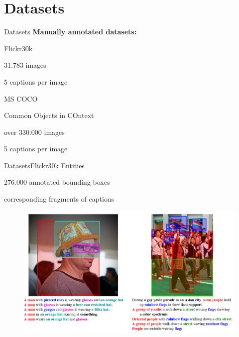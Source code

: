 \documentclass[16pt]{beamer}
\newenvironment{wideitemize}{\itemize\addtolength{\itemsep}{10pt}}{\enditemize}
\begin{document}
\section{Datasets}%
\begin{frame}{Datasets}
\textbf{Manually annotated datasets:}
\begin{wideitemize}
\item Flickr30k \cite{Young2014}
\begin{wideitemize}
    \item 31.783 images
    \item 5 captions per image
\end{wideitemize}
\item MS COCO \cite{Lin2014}
\begin{wideitemize}
\item Common Objects in COntext
\item over 330.000 images
\item 5 captions per image
\end{wideitemize}
\end {wideitemize}

\end{frame}

\begin{frame}{Datasets}{Flickr30k Entities \cite{Plummer2015}}
\begin{wideitemize}
\item 276.000 annotated bounding boxes 
\item corresponding fragments of captions
\end{wideitemize}
\begin{figure}[tb]
           \centering
           \includegraphics[width=\linewidth]{entities.png}
           \end{figure}

\end{frame}
\end{document}
